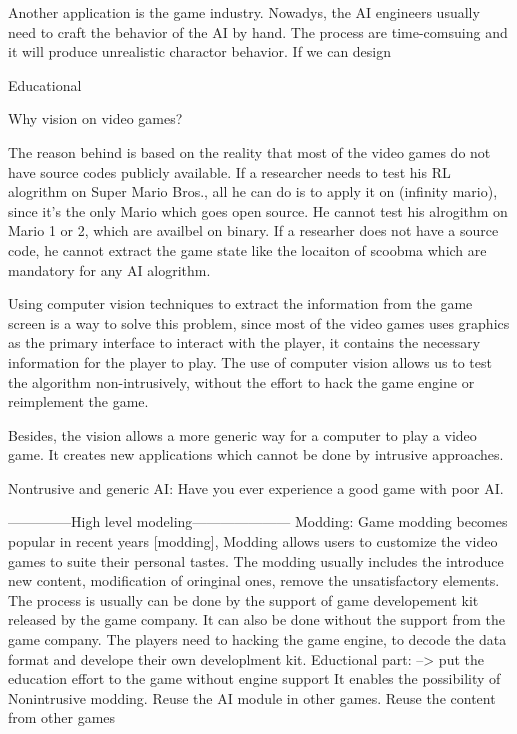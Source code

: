 Another application is the game industry.
Nowadys, the AI engineers usually need to craft the behavior of the AI by hand. 
The process are time-comsuing and it will produce unrealistic charactor behavior.
If we can design 

Educational


Why vision on video games?

The reason behind is based on the reality that most of the video games do not have source codes publicly available.
If a researcher needs to test his RL alogrithm on Super Mario Bros., all he can do is to apply it on (infinity mario),
since it's the only Mario which goes open source. He cannot test his alrogithm on Mario 1 or 2, which are availbel
on binary. If a researher does not have a source code, he cannot extract the game state like the locaiton
of scoobma which are mandatory for any AI alogrithm. 

Using computer vision techniques to extract the information from the game screen is a way to solve this problem,
since most of the video games uses graphics as the primary interface to interact with the player, it contains
the necessary information for the player to play. The use of computer vision allows us to test the algorithm
non-intrusively, without the effort to hack the game engine or reimplement the game.

Besides, the vision allows a more generic way for a computer to play a video game. It creates 
new applications which cannot be done by intrusive approaches.

Nontrusive and generic AI:
Have you ever experience a good game with poor AI.

--------------High level modeling---------------------
Modding: 
Game modding becomes popular in recent years [modding], 
Modding allows users to customize the video games to suite their personal tastes.
The modding usually includes the introduce new content, modification of oringinal ones, remove the unsatisfactory elements.
The process is usually can be done by the support of game developement kit released by the game company.
It can also be done without the support from the game company. The players need to hacking the game engine,
to decode the data format and develope their own developlment kit. 
Eductional part: --> put the education effort to the game without engine support
It enables the possibility of Nonintrusive modding.
Reuse the AI module in other games. Reuse the content from other games

